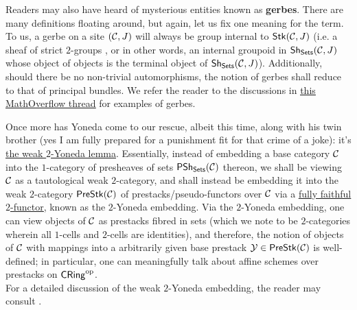 \begin{convention}
\begin{enumerate}
                Readers may also have heard of mysterious entities known as \textbf{gerbes}. There are many definitions floating around, but again, let us fix one meaning for the term. To us, a gerbe on a site $(\mathcal{C}, J)$ will always be group internal to $\mathsf{Stk}(\mathcal{C}, J)$ (i.e. a sheaf of strict $2$-groups \cite{nlab:strict_2-group}, or in other words, an internal groupoid in $\mathsf{Sh}_{\mathsf{Sets}}(\mathcal{C}, J)$ whose object of objects is the terminal object of $\mathsf{Sh}_{\mathsf{Sets}}(\mathcal{C}, J)$). Additionally, should there be no non-trivial automorphisms, the notion of gerbes shall reduce to that of principal bundles. We refer the reader to the discussions in \href{https://mathoverflow.net/questions/263832/phenomena-of-gerbes}{\underline{this MathOverflow thread}} for examples of gerbes. 
            \end{enumerate}
        \end{convention}
        
        \begin{remark} \label{remark: weak_2_yoneda}
            Once more has Yoneda come to our rescue, albeit this time, along with his twin brother (yes I am fully prepared for a punishment fit for that crime of a joke): it's \href{https://ncatlab.org/nlab/show/Yoneda+lemma+for+bicategories}{\underline{the weak $2$-Yoneda lemma}}. Essentially, instead of embedding a base category $\mathcal{C}$ into the $1$-category of presheaves of sets $\mathsf{PSh}_{\mathsf{Sets}}(\mathcal{C})$ thereon, we shall be viewing $\mathcal{C}$ as a tautological weak $2$-category, and shall instead be embedding it into the weak $2$-category $\mathsf{Pre}\mathsf{Stk}(\mathcal{C})$ of prestacks/pseudo-functors over $\mathcal{C}$ via a \href{https://ncatlab.org/nlab/show/full+sub-2-category}{\underline{fully faithful $2$-functor}}, known as the $2$-Yoneda embedding. Via the $2$-Yoneda embedding, one can view objects of $\mathcal{C}$ as prestacks fibred in sets (which we note to be $2$-categories wherein all $1$-cells and $2$-cells are identities), and therefore, the notion of objects of $\mathcal{C}$ with mappings into a arbitrarily given base prestack $\mathcal{Y} \in \mathsf{Pre}\mathsf{Stk}(\mathcal{C})$ is well-defined; in particular, one can meaningfully talk about affine schemes over prestacks on $\mathsf{CRing}^{\mathrm{op}}$. 
            \\
            For a detailed discussion of the weak $2$-Yoneda embedding, the reader may consult \cite{nlab:yoneda_lemma_for_bicategories}.
        \end{remark}
        
